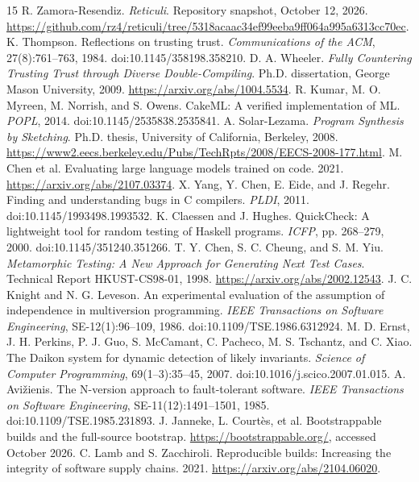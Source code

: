 \documentclass[10pt,twocolumn,letterpaper]{article}
\begin{document}
\begin{thebibliography}{15}\small
{} R. Zamora-Resendiz. \emph{Reticuli}. Repository snapshot, October 12, 2026. \url{https://github.com/rz4/reticuli/tree/5318acaac34ef99eeba9ff064a995a6313cc70ec}.
 K. Thompson. Reflections on trusting trust. \emph{Communications of the ACM}, 27(8):761--763, 1984. doi:10.1145/358198.358210.
 D. A. Wheeler. \emph{Fully Countering Trusting Trust through Diverse Double-Compiling}. Ph.D. dissertation, George Mason University, 2009. \url{https://arxiv.org/abs/1004.5534}.
 R. Kumar, M. O. Myreen, M. Norrish, and S. Owens. CakeML: A verified implementation of ML. \emph{POPL}, 2014. doi:10.1145/2535838.2535841.
 A. Solar-Lezama. \emph{Program Synthesis by Sketching}. Ph.D. thesis, University of California, Berkeley, 2008. \url{https://www2.eecs.berkeley.edu/Pubs/TechRpts/2008/EECS-2008-177.html}.
 M. Chen et al. Evaluating large language models trained on code. 2021. \url{https://arxiv.org/abs/2107.03374}.
 X. Yang, Y. Chen, E. Eide, and J. Regehr. Finding and understanding bugs in C compilers. \emph{PLDI}, 2011. doi:10.1145/1993498.1993532.
 K. Claessen and J. Hughes. QuickCheck: A lightweight tool for random testing of Haskell programs. \emph{ICFP}, pp. 268--279, 2000. doi:10.1145/351240.351266.
 T. Y. Chen, S. C. Cheung, and S. M. Yiu. \emph{Metamorphic Testing: A New Approach for Generating Next Test Cases}. Technical Report HKUST-CS98-01, 1998. \url{https://arxiv.org/abs/2002.12543}.
 J. C. Knight and N. G. Leveson. An experimental evaluation of the assumption of independence in multiversion programming. \emph{IEEE Transactions on Software Engineering}, SE-12(1):96--109, 1986. doi:10.1109/TSE.1986.6312924.
 M. D. Ernst, J. H. Perkins, P. J. Guo, S. McCamant, C. Pacheco, M. S. Tschantz, and C. Xiao. The Daikon system for dynamic detection of likely invariants. \emph{Science of Computer Programming}, 69(1--3):35--45, 2007. doi:10.1016/j.scico.2007.01.015.
 A. Avi\v{z}ienis. The N-version approach to fault-tolerant software. \emph{IEEE Transactions on Software Engineering}, SE-11(12):1491--1501, 1985. doi:10.1109/TSE.1985.231893.
 J. Janneke, L. Courtès, et al. Bootstrappable builds and the full-source bootstrap. \url{https://bootstrappable.org/}, accessed October 2026.
 C. Lamb and S. Zacchiroli. Reproducible builds: Increasing the integrity of software supply chains. 2021. \url{https://arxiv.org/abs/2104.06020}.
\end{thebibliography}
\end{document}
